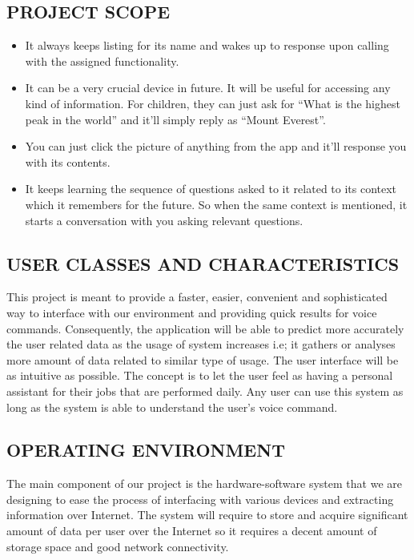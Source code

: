 \documentclass[12pt]{extreport}
\begin{document}
     \subsection{PROJECT SCOPE}
    \begin{itemize}
    \item It always keeps listing for its name and wakes up to response upon calling with the assigned functionality.
    \item It can be a very crucial device in future. It will be useful for accessing any kind of information. For children, they can just ask for “What is the highest peak in the world” and it’ll simply reply as “Mount Everest”.
    \item You can just click the picture of anything from the app and it’ll response you with its contents.
    \item It keeps learning the sequence of questions asked to it related to its context which it remembers for the future. So when the same context is mentioned, it starts a conversation with you asking relevant questions.
\end{itemize}
     \subsection{USER CLASSES AND CHARACTERISTICS}
\hspace*{3em}This project is meant to provide a faster, easier, convenient and sophisticated way to interface with our environment and providing quick results for voice commands. Consequently, the application will be able to predict more accurately the user related data as the usage of system increases i.e; it gathers or analyses more amount of data related to similar type of usage. The user interface will be as intuitive as possible. The concept is to let the user feel as having a personal assistant for their jobs that are performed daily. Any user can use this system as long as the system is able to understand the user's voice command.
     \subsection{OPERATING ENVIRONMENT}
\hspace*{3em}The main component of our project is the hardware-software system that we are designing to ease the process of interfacing with various devices and extracting information over Internet. The system will require to store and acquire significant amount of data per user over the Internet so it requires a decent amount of storage space and good network connectivity.
\end{document}
